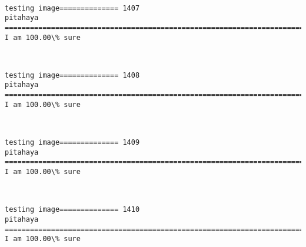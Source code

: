 \documentclass[11pt]{article}
\begin{document}
    \begin{center}
    \end{center}
    { \hspace*{\fill} \\}
    
    \begin{Verbatim}[commandchars=\\\{\}]
testing image============== 1407
pitahaya
============================================================================
I am 100.00\% sure

    \end{Verbatim}

    \begin{center}
    \end{center}
    { \hspace*{\fill} \\}
    
    \begin{Verbatim}[commandchars=\\\{\}]
testing image============== 1408
pitahaya
============================================================================
I am 100.00\% sure

    \end{Verbatim}

    \begin{center}
    \end{center}
    { \hspace*{\fill} \\}
    
    \begin{Verbatim}[commandchars=\\\{\}]
testing image============== 1409
pitahaya
============================================================================
I am 100.00\% sure

    \end{Verbatim}

    \begin{center}
    \end{center}
    { \hspace*{\fill} \\}
    
    \begin{Verbatim}[commandchars=\\\{\}]
testing image============== 1410
pitahaya
============================================================================
I am 100.00\% sure

    \end{Verbatim}
\end{document}
